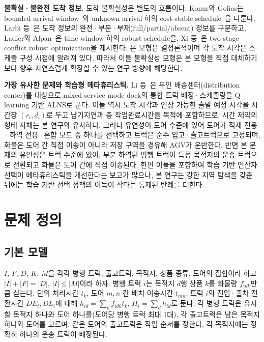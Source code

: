 \documentclass[10pt,a4paper]{article}
\begin{document}
\textbf{불확실·불완전 도착 정보.} 도착 불확실성은 별도의 흐름이다. Konur와
Golias는 bounded arrival window~\cite{konur2013}와 unknown arrival 하의 cost-stable
schedule~\cite{konurcost2013}을 다룬다. Larbi 등~\cite{larbi2011}은 도착 정보의
완전·부분·부재(full/partial/absent) 정보를 구분하고, Ladier와 Alpan~\cite{ladier2016}은 time window
하의 robust schedule을, Xi 등~\cite{xi2020}은 two-stage conflict robust
optimization을 제시한다. 본 모형은 결정론적이며 각 도착 시각은 스케줄 구성
시점에 알려져 있다. 따라서 이들 불확실성 모형은 본 모형을 직접 대체하기보다 향후
자연스럽게 확장할 수 있는 연구 방향에 해당한다.

\textbf{가장 유사한 문제와 학습형 메타휴리스틱.} Li 등~\cite{li2026}은 무인
배송센터(distribution center)를 대상으로 mixed service mode dock의 통합 트럭
배정·스케줄링을 Q-learning 기반 ALNS로 푼다. 이들 역시 도착 시각과 연장 가능한
출발 예정 시각을 시간창 $(r_i,d_i)$로 두고 납기지연과 총 작업완료시간을 목적에 포함하므로,
시간 제약의 형태 자체는 본 연구와 유사하다. 그러나 유연성이 도어 수준에 있어 도어가
적재 전용·하역 전용·혼합 모드 중 하나를 선택하고 트럭은 순수 입고·출고트럭으로
고정되며, 화물은 도어 간 직접 이송이 아니라 저장 구역을 경유해 AGV가 운반한다.
반면 본 문제의 유연성은 트럭 수준에 있어, 부분 하역된 병행 트럭이 특정 목적지의
운송 트럭으로 전환되고 화물은 도어 간에 직접 이송된다. 한편 이들을 포함하여 학습 기반
연산자 선택이 메타휴리스틱을 개선한다는 보고가 많으나, 본 연구는 강한 지역
탐색을 갖춘 뒤에는 학습 기반 선택 정책의 이득이 작다는 통제된 반례를 더한다.

\section{문제 정의}

\subsection{기본 모델}
$I$, $F$, $D$, $K$, $M$을 각각 병행 트럭, 출고트럭, 목적지, 상품 종류,
도어의 집합이라 하고 $|I|+|F|=|D|$, $|I|\le|M|$이라 하자. 병행 트럭 $i$는
목적지 $d$행 상품 $k$를 화물량 $f_{idk}$만큼 싣는다. 단위 처리시간 $t_k$, 도어
$m,n$ 간 배치 이송시간 $t_{mn}$, 트럭 $i$의 진입·출차 전환시간
$DE_i,DL_i$에 대해 $h_{id}=\sum_k f_{idk}t_k$, $H_i=\sum_d h_{id}$로 둔다. 각
병행 트럭은 유지할 목적지 하나와 도어 하나를(도어당 병행 트럭 최대 1대), 각
출고트럭은 남은 목적지 하나와 도어를 고르며, 같은 도어의 출고트럭은
작업 순서를 정한다. 각 목적지에는 정확히 하나의 운송 트럭이 배정된다.
\end{document}

